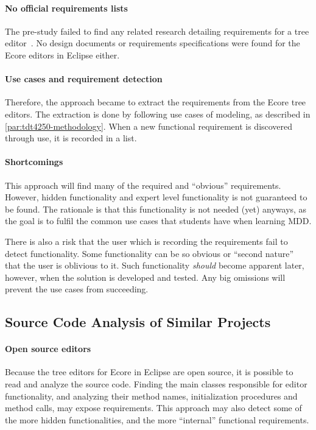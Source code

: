 \paragraph{No official requirements lists}
The pre-study failed to find any related research detailing requirements for a tree editor~\cite[p.~3]{rekstadModelingEnvironmentCloud2020}.
No design documents or requirements specifications were found for the \gls{Ecore} editors in \gls{Eclipse} either.


\paragraph{Use cases and requirement detection}
Therefore, the approach became to extract the requirements from the \gls{Ecore} tree editors.
The extraction is done by following use cases of modeling, as described in \cref{par:tdt4250-methodology}.
When a new functional requirement is discovered through use, it is recorded in a list.


\paragraph{Shortcomings}
This approach will find many of the required and ``obvious'' requirements.
However, hidden functionality and expert level functionality is not guaranteed to be found.
The rationale is that this functionality is not needed (yet) anyways, as the goal is to fulfil the common use cases that students have when learning \acrshort{MDD}.


There is also a risk that the user which is recording the requirements fail to detect functionality.
Some functionality can be so obvious or ``second nature'' that the user is oblivious to it.
Such functionality \textit{should} become apparent later, however, when the solution is developed and tested.
Any big omissions will prevent the use cases from succeeding.


\subsection{Source Code Analysis of Similar Projects}

\paragraph{Open source editors}
Because the tree editors for \gls{Ecore} in \gls{Eclipse} are \gls{open source}, it is possible to read and analyze the source code.
Finding the main classes responsible for editor functionality, and analyzing their method names, initialization procedures and method calls, may expose requirements.
This approach may also detect some of the more hidden functionalities, and the more ``internal'' functional requirements.


